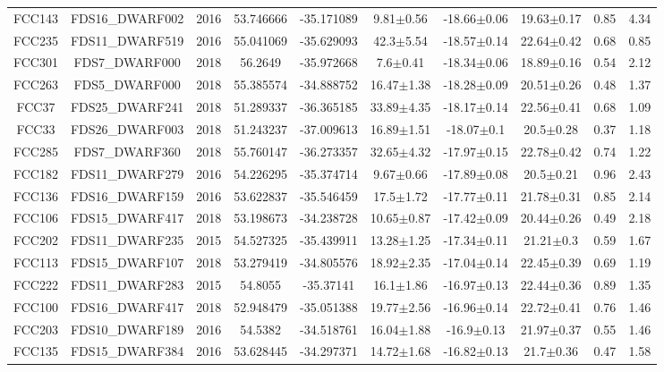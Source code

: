 \documentclass{aa}
\begin{document}
\begin{table}
\begin{center}
{{\begin{tabular}{|cccccccccc|}
FCC143 & FDS16\_DWARF002 & 2016 & 53.746666 & -35.171089 & 9.81$\pm$0.56 & -18.66$\pm$0.06 & 19.63$\pm$0.17 & 0.85 & 4.34 \\
FCC235 & FDS11\_DWARF519 & 2016 & 55.041069 & -35.629093 & 42.3$\pm$5.54 & -18.57$\pm$0.14 & 22.64$\pm$0.42 & 0.68 & 0.85 \\
FCC301 & FDS7\_DWARF000 & 2018 & 56.2649 & -35.972668 & 7.6$\pm$0.41 & -18.34$\pm$0.06 & 18.89$\pm$0.16 & 0.54 & 2.12 \\
FCC263 & FDS5\_DWARF000 & 2018 & 55.385574 & -34.888752 & 16.47$\pm$1.38 & -18.28$\pm$0.09 & 20.51$\pm$0.26 & 0.48 & 1.37 \\
FCC37 & FDS25\_DWARF241 & 2018 & 51.289337 & -36.365185 & 33.89$\pm$4.35 & -18.17$\pm$0.14 & 22.56$\pm$0.41 & 0.68 & 1.09 \\
FCC33 & FDS26\_DWARF003 & 2018 & 51.243237 & -37.009613 & 16.89$\pm$1.51 & -18.07$\pm$0.1 & 20.5$\pm$0.28 & 0.37 & 1.18 \\
FCC285 & FDS7\_DWARF360 & 2018 & 55.760147 & -36.273357 & 32.65$\pm$4.32 & -17.97$\pm$0.15 & 22.78$\pm$0.42 & 0.74 & 1.22 \\
FCC182 & FDS11\_DWARF279 & 2016 & 54.226295 & -35.374714 & 9.67$\pm$0.66 & -17.89$\pm$0.08 & 20.5$\pm$0.21 & 0.96 & 2.43 \\
FCC136 & FDS16\_DWARF159 & 2016 & 53.622837 & -35.546459 & 17.5$\pm$1.72 & -17.77$\pm$0.11 & 21.78$\pm$0.31 & 0.85 & 2.14 \\
FCC106 & FDS15\_DWARF417 & 2018 & 53.198673 & -34.238728 & 10.65$\pm$0.87 & -17.42$\pm$0.09 & 20.44$\pm$0.26 & 0.49 & 2.18 \\
FCC202 & FDS11\_DWARF235 & 2015 & 54.527325 & -35.439911 & 13.28$\pm$1.25 & -17.34$\pm$0.11 & 21.21$\pm$0.3 & 0.59 & 1.67 \\
FCC113 & FDS15\_DWARF107 & 2018 & 53.279419 & -34.805576 & 18.92$\pm$2.35 & -17.04$\pm$0.14 & 22.45$\pm$0.39 & 0.69 & 1.19 \\
FCC222 & FDS11\_DWARF283 & 2015 & 54.8055 & -35.37141 & 16.1$\pm$1.86 & -16.97$\pm$0.13 & 22.44$\pm$0.36 & 0.89 & 1.35 \\
FCC100 & FDS16\_DWARF417 & 2018 & 52.948479 & -35.051388 & 19.77$\pm$2.56 & -16.96$\pm$0.14 & 22.72$\pm$0.41 & 0.76 & 1.46 \\
FCC203 & FDS10\_DWARF189 & 2016 & 54.5382 & -34.518761 & 16.04$\pm$1.88 & -16.9$\pm$0.13 & 21.97$\pm$0.37 & 0.55 & 1.46 \\
FCC135 & FDS15\_DWARF384 & 2016 & 53.628445 & -34.297371 & 14.72$\pm$1.68 & -16.82$\pm$0.13 & 21.7$\pm$0.36 & 0.47 & 1.58 \\

\end{tabular}}}
\end{center}
\end{table}
\end{document}
